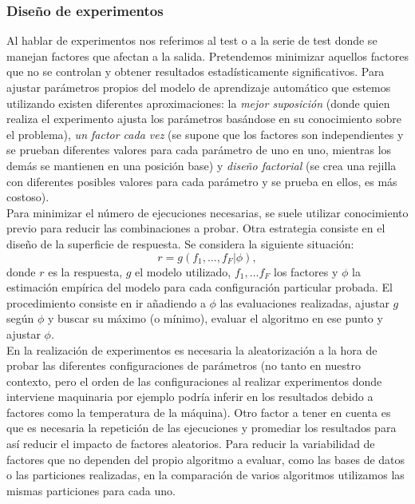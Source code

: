 \subsubsection{Diseño de experimentos}

	Al hablar de experimentos nos referimos al test o a la serie de test donde se manejan factores que afectan a la salida. Pretendemos minimizar aquellos factores que no se controlan y obtener resultados estadísticamente significativos. Para ajustar parámetros propios del modelo de aprendizaje automático que estemos utilizando existen diferentes aproximaciones: la \textit{mejor suposición} (donde quien realiza el experimento ajusta los parámetros basándose en su conocimiento sobre el problema), \textit{un factor cada vez} (se supone que los factores son independientes y se prueban diferentes valores para cada parámetro de uno en uno, mientras los demás se mantienen en una posición base) y \textit{diseño factorial} (se crea una rejilla con diferentes posibles valores para cada parámetro y se prueba en ellos, es más costoso).\\
	Para minimizar el número de ejecuciones necesarias, se suele utilizar conocimiento previo para reducir las combinaciones a probar. Otra estrategia consiste en el diseño de la superficie de respuesta. Se considera la siguiente situación:
		\[ r = g( f_1, \dots, f_F | \phi ), \]
	donde $r$ es la respuesta, $g$ el modelo utilizado, $f_1, \dots f_F$ los factores y $\phi$ la estimación empírica del modelo para cada configuración particular probada. El procedimiento consiste en ir añadiendo a $\phi$ las evaluaciones realizadas, ajustar $g$ según $\phi$ y buscar su máximo (o mínimo), evaluar el algoritmo en ese punto y ajustar $\phi$.\\
	En la realización de experimentos es necesaria la aleatorización a la hora de probar las diferentes configuraciones de parámetros (no tanto en nuestro contexto, pero el orden de las configuraciones al realizar experimentos donde interviene maquinaria por ejemplo podría inferir en los resultados debido a factores como la temperatura de la máquina). Otro factor a tener en cuenta es que es necesaria la repetición de las ejecuciones y promediar los resultados para así reducir el impacto de factores aleatorios. Para reducir la variabilidad de factores que no dependen del propio algoritmo a evaluar, como las bases de datos o las particiones realizadas, en la comparación de varios algoritmos utilizamos las mismas particiones para cada uno.

